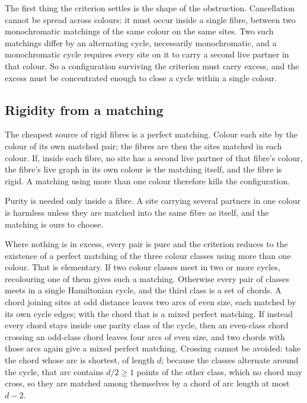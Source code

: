 \documentclass[11pt]{article}
\theoremstyle{definition}
\theoremstyle{remark}
\begin{document}
The first thing the criterion settles is the shape of the obstruction.  Cancellation cannot be
spread across colours: it must occur inside a single fibre, between two monochromatic matchings of
the same colour on the same sites.  Two such matchings differ by an alternating cycle, necessarily
monochromatic, and a monochromatic cycle requires every site on it to carry a second live partner in
that colour.  So a configuration surviving the criterion must carry excess, and the excess must be
concentrated enough to close a cycle within a single colour.

\subsection*{Rigidity from a matching}

The cheapest source of rigid fibres is a perfect matching.  Colour each site by the colour of its own
matched pair; the fibres are then the sites matched in each colour.  If, inside each fibre, no site
has a second live partner of that fibre's colour, the fibre's live graph in its own colour is the
matching itself, and the fibre is rigid.  A matching using more than one colour therefore kills the
configuration.

Purity is needed only inside a fibre.  A site carrying several partners in one colour is harmless
unless they are matched into the same fibre as itself, and the matching is ours to choose.

Where nothing is in excess, every pair is pure and the criterion reduces to the existence of a
perfect matching of the three colour classes using more than one colour.  That is elementary.  If two
colour classes meet in two or more cycles, recolouring one of them gives such a matching.  Otherwise
every pair of classes meets in a single Hamiltonian cycle, and the third class is a set of chords.  A
chord joining sites at odd distance leaves two arcs of even size, each matched by its own cycle
edges; with the chord that is a mixed perfect matching.  If instead every chord stays inside one
parity class of the cycle, then an even-class chord crossing an odd-class chord leaves four arcs of
even size, and two chords with those arcs again give a mixed perfect matching.  Crossing cannot be
avoided: take the chord whose arc is shortest, of length $d$; because the classes alternate around
the cycle, that arc contains $d/2 \ge 1$ points of the other class, which no chord may cross, so they
are matched among themselves by a chord of arc length at most $d-2$.
\end{document}
